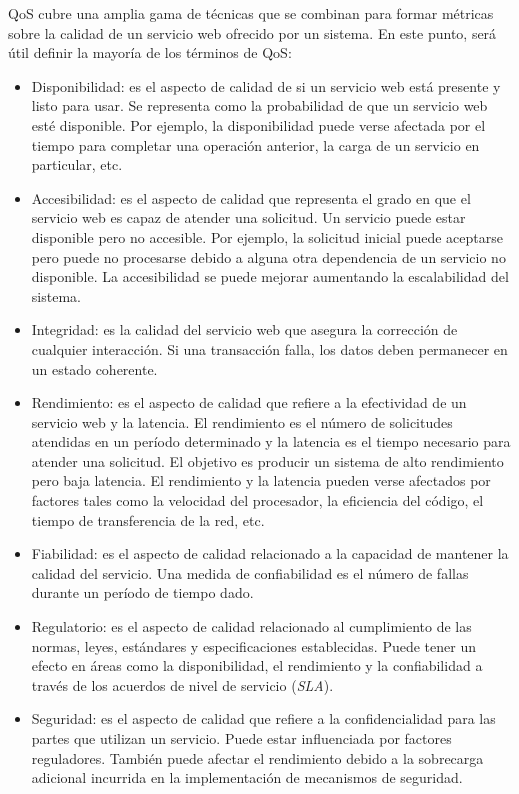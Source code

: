 \par QoS cubre una amplia gama de técnicas que se combinan para formar métricas sobre la calidad de un servicio web ofrecido por un sistema. En este punto, será útil definir la mayoría de los términos de QoS:
\begin{itemize}
    \item Disponibilidad: es el aspecto de calidad de si un servicio web está presente y listo para usar. Se representa como la probabilidad de que un servicio web esté disponible. Por ejemplo, la disponibilidad puede verse afectada por el tiempo para completar una operación anterior, la carga de un servicio en particular, etc.
    \item Accesibilidad: es el aspecto de calidad que representa el grado en que el servicio web es capaz de atender una solicitud. Un servicio puede estar disponible pero no accesible. Por ejemplo, la solicitud inicial puede aceptarse pero puede no procesarse debido a alguna otra dependencia de un servicio no disponible. La accesibilidad se puede mejorar aumentando la escalabilidad del sistema.
    \item Integridad: es la calidad del servicio web que asegura la corrección de cualquier interacción. Si una transacción falla, los datos deben permanecer en un estado coherente.
    \item Rendimiento: es el aspecto de calidad que refiere a la efectividad de un servicio web y la latencia. El rendimiento es el número de solicitudes atendidas en un período determinado y la latencia es el tiempo necesario para atender una solicitud. El objetivo es producir un sistema de alto rendimiento pero baja latencia. El rendimiento y la latencia pueden verse afectados por factores tales como la velocidad del procesador, la eficiencia del código, el tiempo de transferencia de la red, etc.
    \item Fiabilidad: es el aspecto de calidad relacionado a la capacidad de mantener la calidad del servicio. Una medida de confiabilidad es el número de fallas durante un período de tiempo dado.
    \item Regulatorio: es el aspecto de calidad relacionado al cumplimiento de las normas, leyes, estándares y especificaciones establecidas. Puede tener un efecto en áreas como la disponibilidad, el rendimiento y la confiabilidad a través de los acuerdos de nivel de servicio (\textit{SLA}).
    \item Seguridad: es el aspecto de calidad que refiere a la confidencialidad para las partes que utilizan un servicio. Puede estar influenciada por factores reguladores. También puede afectar el rendimiento debido a la sobrecarga adicional incurrida en la implementación de mecanismos de seguridad.
\end{itemize}

